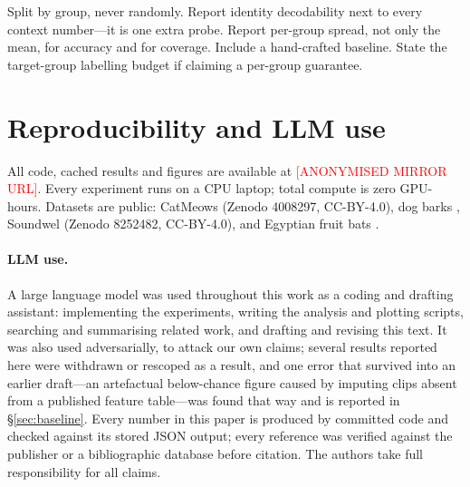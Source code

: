 \documentclass{article}
\begin{document}
Split by group, never randomly. Report identity decodability next to every context number---it is one
extra probe. Report per-group spread, not only the mean, for accuracy and for coverage. Include a
hand-crafted baseline. State the target-group labelling budget if claiming a per-group guarantee.

\section*{Reproducibility and LLM use}

All code, cached results and figures are available at \textcolor{red}{[ANONYMISED MIRROR URL]}. Every
experiment runs on a CPU laptop; total compute is zero GPU-hours. Datasets are public: CatMeows \citep{ludovico2021,ntalampiras2019} (Zenodo 4008297, CC-BY-4.0), dog
barks \citep{molnar2008}, Soundwel \citep{briefer2022} (Zenodo 8252482, CC-BY-4.0), and Egyptian
fruit bats \citep{prat2017}. \paragraph{LLM use.} A large language model was used throughout this work as a coding and drafting
assistant: implementing the experiments, writing the analysis and plotting scripts, searching and
summarising related work, and drafting and revising this text. It was also used adversarially, to
attack our own claims; several results reported here were withdrawn or rescoped as a result, and one
error that survived into an earlier draft---an artefactual below-chance figure caused by imputing
clips absent from a published feature table---was found that way and is reported in
\S\ref{sec:baseline}. Every number in this paper is produced by committed code and checked against
its stored JSON output; every reference was verified against the publisher or a bibliographic
database before citation. The authors take full responsibility for all claims.



\end{document}
